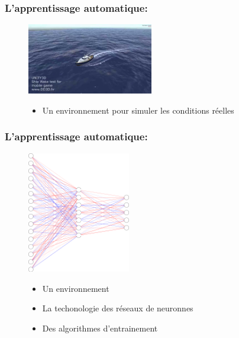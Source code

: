 \documentclass[8pt]{beamer}
\begin{document}
\begin{frame}

  \frametitle{L'apprentissage automatique:}

  \begin{figure}
    \begin{minipage}[c]{.46\linewidth}
      \centering
      \includegraphics[width=55mm]{simulation_boat.jpg}
    \end{minipage}
    \hfill%
    \begin{minipage}[c]{.46\linewidth}
      \centering
      \begin{itemize}
  \item Un environnement pour simuler les conditions réelles \break
    \break \break \break
  \end{itemize}
    \end{minipage}
  \end{figure}

\end{frame}
  
\begin{frame}

  \frametitle{L'apprentissage automatique:}

  \begin{figure}
    \begin{minipage}[c]{.46\linewidth}
      \centering
      \includegraphics[width=45mm]{network_example.png}
    \end{minipage}
    \hfill%
    \begin{minipage}[c]{.46\linewidth}
      \centering
      \begin{itemize}
  \item Un environnement  \break
  \item La techonologie des réseaux de neuronnes\break
    \pause
  \item Des algorithmes d'entrainement
  \end{itemize}
    \end{minipage}
  \end{figure}

\end{frame}
\end{document}
